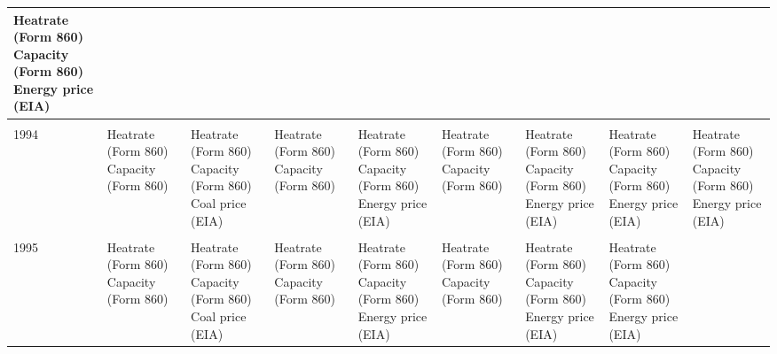 \documentclass[10pt]{report}
\begin{document}
\begin{scriptsize}
\begin{landscape}
\begin{center}
\begin{longtable}{|lllllllll|}
\shortstack{Heatrate (Form 860) \\ Capacity (Form 860) \\ Energy price (EIA)} \\
\hline \\
1994 & \shortstack{Heatrate (Form 860) \\ Capacity (Form 860)}  &
\shortstack{Heatrate (Form 860) \\ Capacity (Form 860) \\ Coal price (EIA)} &
\shortstack{Heatrate (Form 860) \\ Capacity (Form 860)} &
\shortstack{Heatrate (Form 860) \\ Capacity (Form 860) \\ Energy price (EIA)} &
\shortstack{Heatrate (Form 860) \\ Capacity (Form 860)} &
\shortstack{Heatrate (Form 860) \\ Capacity (Form 860) \\ Energy price (EIA)} &
\shortstack{Heatrate (Form 860) \\ Capacity (Form 860) \\ Energy price (EIA)} &
\shortstack{Heatrate (Form 860) \\ Capacity (Form 860) \\ Energy price (EIA)} \\
\hline \\
1995 & \shortstack{Heatrate (Form 860) \\ Capacity (Form 860)}  &
\shortstack{Heatrate (Form 860) \\ Capacity (Form 860) \\ Coal price (EIA)} &
\shortstack{Heatrate (Form 860) \\ Capacity (Form 860)} &
\shortstack{Heatrate (Form 860) \\ Capacity (Form 860) \\ Energy price (EIA)} &
\shortstack{Heatrate (Form 860) \\ Capacity (Form 860)} &
\shortstack{Heatrate (Form 860) \\ Capacity (Form 860) \\ Energy price (EIA)} &
\shortstack{Heatrate (Form 860) \\ Capacity (Form 860) \\ Energy price (EIA)} &

\end{longtable}
\end{center}
\end{landscape}
\end{scriptsize}
\end{document}
